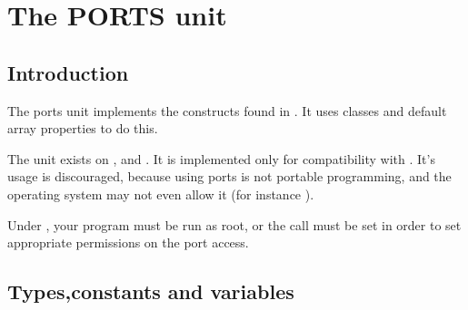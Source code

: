 %
%
%
%
%
\chapter{The PORTS unit}

\section{Introduction}
The ports unit implements the  constructs found in \tp. 
It uses classes and default array properties to do this.

The unit exists on \linux, \ostwo and \dos. It is implemented only for
compatibility with \tp. It's usage is discouraged, because using ports
is not portable programming, and the operating system may not even allow
it (for instance \windows).

Under \linux, your program must be run as root, or the  call
must be set in order to set appropriate permissions on the port access.

\section{Types,constants and variables}

